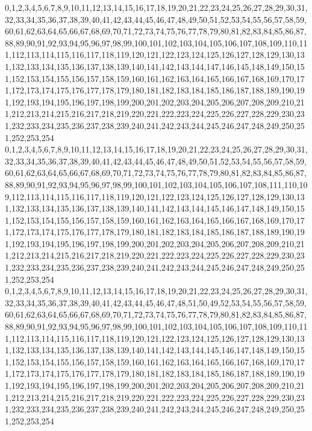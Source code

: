 \documentclass[12pt]{article}
\begin{document}
{0,1,2,3,4,5,6,7,8,9,10,11,12,13,14,15,16,17,18,19,20,21,22,23,24,25,26,27,28,29,30,31,32,33,34,35,36,37,38,39,40,41,42,43,44,45,46,47,48,49,50,51,52,53,54,55,56,57,58,59,60,61,62,63,64,65,66,67,68,69,70,71,72,73,74,75,76,77,78,79,80,81,82,83,84,85,86,87,88,89,90,91,92,93,94,95,96,97,98,99,100,101,102,103,104,105,106,107,108,109,110,111,112,113,114,115,116,117,118,119,120,121,122,123,124,125,126,127,128,129,130,131,132,133,134,135,136,137,138,139,140,141,142,143,144,147,146,145,148,149,150,151,152,153,154,155,156,157,158,159,160,161,162,163,164,165,166,167,168,169,170,171,172,173,174,175,176,177,178,179,180,181,182,183,184,185,186,187,188,189,190,191,192,193,194,195,196,197,198,199,200,201,202,203,204,205,206,207,208,209,210,211,212,213,214,215,216,217,218,219,220,221,222,223,224,225,226,227,228,229,230,231,232,233,234,235,236,237,238,239,240,241,242,243,244,245,246,247,248,249,250,251,252,253,254\\
0,1,2,3,4,5,6,7,8,9,10,11,12,13,14,15,16,17,18,19,20,21,22,23,24,25,26,27,28,29,30,31,32,33,34,35,36,37,38,39,40,41,42,43,44,45,46,47,48,49,50,51,52,53,54,55,56,57,58,59,60,61,62,63,64,65,66,67,68,69,70,71,72,73,74,75,76,77,78,79,80,81,82,83,84,85,86,87,88,89,90,91,92,93,94,95,96,97,98,99,100,101,102,103,104,105,106,107,108,111,110,109,112,113,114,115,116,117,118,119,120,121,122,123,124,125,126,127,128,129,130,131,132,133,134,135,136,137,138,139,140,141,142,143,144,145,146,147,148,149,150,151,152,153,154,155,156,157,158,159,160,161,162,163,164,165,166,167,168,169,170,171,172,173,174,175,176,177,178,179,180,181,182,183,184,185,186,187,188,189,190,191,192,193,194,195,196,197,198,199,200,201,202,203,204,205,206,207,208,209,210,211,212,213,214,215,216,217,218,219,220,221,222,223,224,225,226,227,228,229,230,231,232,233,234,235,236,237,238,239,240,241,242,243,244,245,246,247,248,249,250,251,252,253,254\\
0,1,2,3,4,5,6,7,8,9,10,11,12,13,14,15,16,17,18,19,20,21,22,23,24,25,26,27,28,29,30,31,32,33,34,35,36,37,38,39,40,41,42,43,44,45,46,47,48,51,50,49,52,53,54,55,56,57,58,59,60,61,62,63,64,65,66,67,68,69,70,71,72,73,74,75,76,77,78,79,80,81,82,83,84,85,86,87,88,89,90,91,92,93,94,95,96,97,98,99,100,101,102,103,104,105,106,107,108,109,110,111,112,113,114,115,116,117,118,119,120,121,122,123,124,125,126,127,128,129,130,131,132,133,134,135,136,137,138,139,140,141,142,143,144,145,146,147,148,149,150,151,152,153,154,155,156,157,158,159,160,161,162,163,164,165,166,167,168,169,170,171,172,173,174,175,176,177,178,179,180,181,182,183,184,185,186,187,188,189,190,191,192,193,194,195,196,197,198,199,200,201,202,203,204,205,206,207,208,209,210,211,212,213,214,215,216,217,218,219,220,221,222,223,224,225,226,227,228,229,230,231,232,233,234,235,236,237,238,239,240,241,242,243,244,245,246,247,248,249,250,251,252,253,254\\
}
\end{document}
